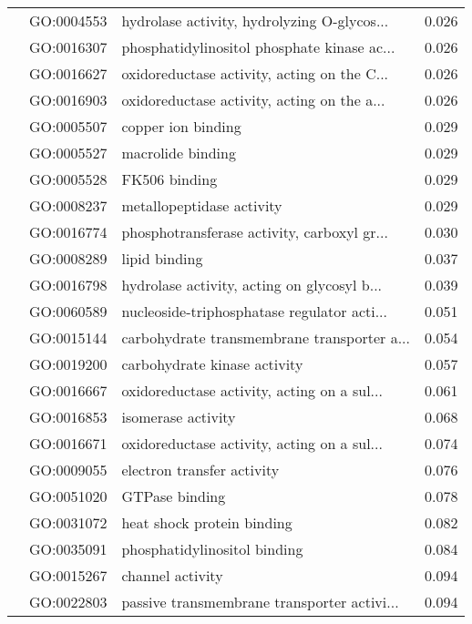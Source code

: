 \begin{longtable}{lllr}
   & GO:0004553 &  hydrolase activity, hydrolyzing O-glycos... &         0.026 \\
   & GO:0016307 &  phosphatidylinositol phosphate kinase ac... &         0.026 \\
   & GO:0016627 &  oxidoreductase activity, acting on the C... &         0.026 \\
   & GO:0016903 &  oxidoreductase activity, acting on the a... &         0.026 \\
   & GO:0005507 &                           copper ion binding &         0.029 \\
   & GO:0005527 &                            macrolide binding &         0.029 \\
   & GO:0005528 &                                FK506 binding &         0.029 \\
   & GO:0008237 &                    metallopeptidase activity &         0.029 \\
   & GO:0016774 &  phosphotransferase activity, carboxyl gr... &         0.030 \\
   & GO:0008289 &                                lipid binding &         0.037 \\
   & GO:0016798 &  hydrolase activity, acting on glycosyl b... &         0.039 \\
   & GO:0060589 &  nucleoside-triphosphatase regulator acti... &         0.051 \\
   & GO:0015144 &  carbohydrate transmembrane transporter a... &         0.054 \\
   & GO:0019200 &                 carbohydrate kinase activity &         0.057 \\
   & GO:0016667 &  oxidoreductase activity, acting on a sul... &         0.061 \\
   & GO:0016853 &                           isomerase activity &         0.068 \\
   & GO:0016671 &  oxidoreductase activity, acting on a sul... &         0.074 \\
   & GO:0009055 &                   electron transfer activity &         0.076 \\
   & GO:0051020 &                               GTPase binding &         0.078 \\
   & GO:0031072 &                   heat shock protein binding &         0.082 \\
   & GO:0035091 &                 phosphatidylinositol binding &         0.084 \\
   & GO:0015267 &                             channel activity &         0.094 \\
   & GO:0022803 &  passive transmembrane transporter activi... &         0.094 \\
\end{longtable}
